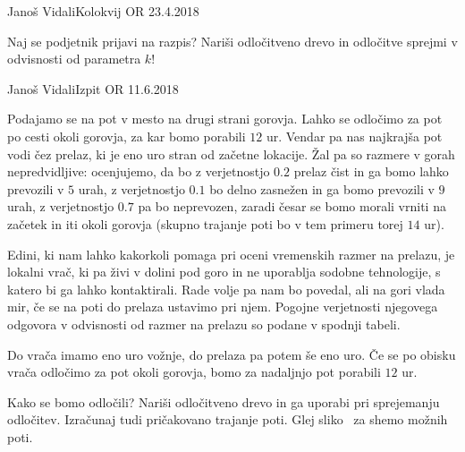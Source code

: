 \begin{naloga}{Janoš Vidali}{Kolokvij OR 23.4.2018}
\begin{vprasanje}
\begin{enumerate}[(a)]
Naj se podjetnik prijavi na razpis?
Nariši odločitveno drevo in odločitve sprejmi v odvisnosti od parametra $k$!
\end{enumerate}
\end{vprasanje}
\begin{odgovor}
\end{odgovor}
\end{naloga}


\begin{naloga}{Janoš Vidali}{Izpit OR 11.6.2018}
\begin{vprasanje}[vrac]
Podajamo se na pot v mesto na drugi strani gorovja.
Lahko se odločimo za pot po cesti okoli gorovja,
za kar bomo porabili $12$ ur.
Vendar pa nas najkrajša pot vodi čez prelaz,
ki je eno uro stran od začetne lokacije.
Žal pa so razmere v gorah nepredvidljive:
ocenjujemo, da bo z verjetnostjo $0.2$ prelaz čist
in ga bomo lahko prevozili v $5$ urah,
z ve\-rjet\-nost\-jo $0.1$ bo delno zasnežen in ga bomo prevozili v $9$ urah,
z verjetnostjo $0.7$ pa bo neprevozen,
zaradi česar se bomo morali vrniti na začetek in iti okoli gorovja
(skupno trajanje poti bo v tem primeru torej $14$ ur).

Edini, ki nam lahko kakorkoli pomaga pri oceni vremenskih razmer na prelazu,
je lokalni vrač,
ki pa živi v dolini pod goro in ne uporablja sodobne tehnologije,
s katero bi ga lahko kontaktirali.
Rade volje pa nam bo povedal, ali na gori vlada mir,
če se na poti do prelaza ustavimo pri njem.
Pogojne verjetnosti njegovega odgovora v odvisnosti od razmer na prelazu
so podane v spodnji tabeli.
\begin{center}
\end{center}
Do vrača imamo eno uro vožnje, do prelaza pa potem še eno uro.
Če se po obisku vrača odločimo za pot okoli gorovja,
bomo za nadaljnjo pot porabili $12$ ur.

Kako se bomo odločili?
Nariši odločitveno drevo in ga uporabi pri sprejemanju odločitev.
Izračunaj tudi pričakovano trajanje poti.
Glej sliko~\fig{} za shemo možnih poti.

\begin{slika}
\pgfslika
{}
\end{slika}
\end{vprasanje}
\begin{odgovor}
\end{odgovor}
\end{naloga}


